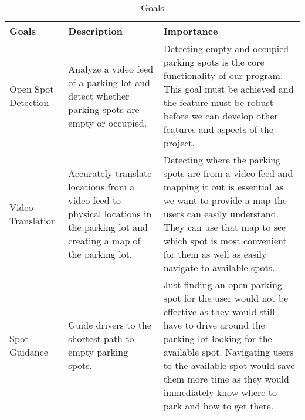 \documentclass[12pt,letterpaper]{article}
\begin{document}
\begin{table}[hp]
\begin{tabularx}{\textwidth}{|X|X|X|}
\toprule
\textbf{Goals} & \textbf{Description} & \textbf{Importance}\\
\midrule
Open Spot Detection & Analyze a video feed of a parking lot and detect whether
parking spots are empty or occupied. & Detecting empty and occupied parking
spots is the core functionality of our program. This goal must be achieved and
the feature must be robust before we can develop other features and aspects of
the project.\\
\hline
Video Translation & Accurately translate locations from a video feed to physical
locations in the parking lot and creating a map of the parking lot. & Detecting
where the parking spots are from a video feed and mapping it out is essential as
we want to provide a map the users can easily understand. They can use that map
to see which spot is most convenient for them as well as easily navigate to
available spots.\\
\hline
Spot Guidance & Guide drivers to the shortest path to empty parking spots. &
Just finding an open parking spot for the user would not be effective as they
would still have to drive around the parking lot looking for the available spot.
Navigating users to the available spot would save them more time as they would
immediately know where to park and how to get there.\\
\bottomrule
\end{tabularx}
\caption{Goals} \label{TblGoals} 
\end{table}
\end{document}
